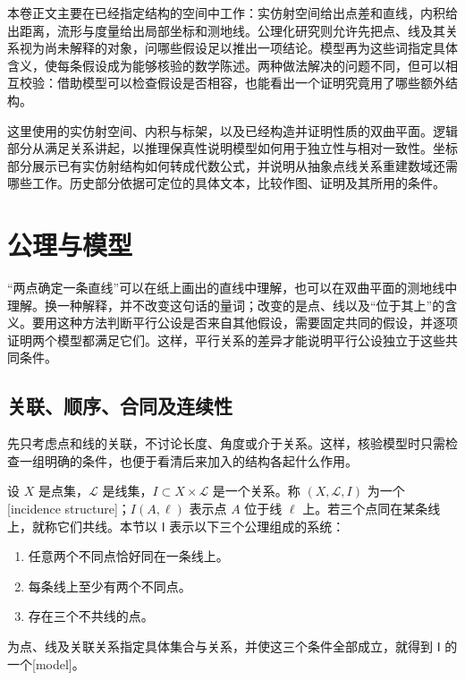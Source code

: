 \ProseParagraphBreak

本卷正文主要在已经指定结构的空间中工作：实仿射空间给出点差和直线，内积给出距离，流形与度量给出局部坐标和测地线。公理化研究则允许先把点、线及其关系视为尚未解释的对象，问哪些假设足以推出一项结论。模型再为这些词指定具体含义，使每条假设成为能够核验的数学陈述。两种做法解决的问题不同，但可以相互校验：借助模型可以检查假设是否相容，也能看出一个证明究竟用了哪些额外结构。

\ProseParagraphBreak

这里使用的实仿射空间、内积与标架，以及已经构造并证明性质的双曲平面。逻辑部分从满足关系讲起，以推理保真性说明模型如何用于独立性与相对一致性。坐标部分展示已有实仿射结构如何转成代数公式，并说明从抽象点线关系重建数域还需哪些工作。历史部分依据可定位的具体文本，比较作图、证明及其所用的条件。

\section{公理与模型}
\label{g1:sec:A01}

“两点确定一条直线”可以在纸上画出的直线中理解，也可以在双曲平面的测地线中理解。换一种解释，并不改变这句话的量词；改变的是点、线以及“位于其上”的含义。要用这种方法判断平行公设是否来自其他假设，需要固定共同的假设，并逐项证明两个模型都满足它们。这样，平行关系的差异才能说明平行公设独立于这些共同条件。

\subsection{关联、顺序、合同及连续性}
\label{g1:subsec:A01:01}

先只考虑点和线的关联，不讨论长度、角度或介于关系。这样，核验模型时只需检查一组明确的条件，也便于看清后来加入的结构各起什么作用。

\begin{definition}
	\label{g1:def:incidence-model}
	设 \(X\) 是点集，\(\mathcal L\) 是线集，\(I\subset X\times\mathcal L\) 是一个关系。称 \((X,\mathcal L,I)\) 为一个[incidence structure]；\(I(A,\ell)\) 表示点 \(A\) 位于线 \(\ell\) 上。若三个点同在某条线上，就称它们共线。本节以 \(\mathsf I\) 表示以下三个公理组成的系统：
	\begin{enumerate}
		\item 任意两个不同点恰好同在一条线上。
		\item 每条线上至少有两个不同点。
		\item 存在三个不共线的点。
	\end{enumerate}
	为点、线及关联关系指定具体集合与关系，并使这三个条件全部成立，就得到 \(\mathsf I\) 的一个[model]。
\end{definition}

